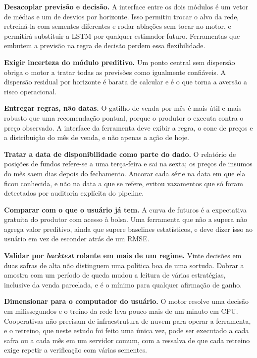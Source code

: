 \begin{alineas}
	\item \textbf{Desacoplar previsão e decisão.} A interface entre os dois módulos é um vetor de médias e um de desvios por horizonte. Isso permitiu trocar o alvo da rede, retreiná-la com sementes diferentes e rodar ablações sem tocar no motor, e permitirá substituir a LSTM por qualquer estimador futuro. Ferramentas que embutem a previsão na regra de decisão perdem essa flexibilidade.
	\item \textbf{Exigir incerteza do módulo preditivo.} Um ponto central sem dispersão obriga o motor a tratar todas as previsões como igualmente confiáveis. A dispersão residual por horizonte é barata de calcular e é o que torna a aversão a risco operacional.
	\item \textbf{Entregar regras, não datas.} O gatilho de venda por mês é mais útil e mais robusto que uma recomendação pontual, porque o produtor o executa contra o preço observado. A interface da ferramenta deve exibir a regra, o cone de preços e a distribuição do mês de venda, e não apenas a ação de hoje.
	\item \textbf{Tratar a data de disponibilidade como parte do dado.} O relatório de posições de fundos refere-se a uma terça-feira e sai na sexta; os preços de insumos do mês saem dias depois do fechamento. Ancorar cada série na data em que ela ficou conhecida, e não na data a que se refere, evitou vazamentos que só foram detectados por auditoria explícita do pipeline.
	\item \textbf{Comparar com o que o usuário já tem.} A curva de futuros é a expectativa gratuita do produtor com acesso à bolsa. Uma ferramenta que não a supera não agrega valor preditivo, ainda que supere baselines estatísticos, e deve dizer isso ao usuário em vez de esconder atrás de um RMSE.
	\item \textbf{Validar por \textit{backtest} rolante em mais de um regime.} Vinte decisões em duas safras de alta não distinguem uma política boa de uma sortuda. Dobrar a amostra com um período de queda mudou a leitura de várias estratégias, inclusive da venda parcelada, e é o mínimo para qualquer afirmação de ganho.
	\item \textbf{Dimensionar para o computador do usuário.} O motor resolve uma decisão em milissegundos e o treino da rede leva pouco mais de um minuto em CPU. Cooperativas não precisam de infraestrutura de nuvem para operar a ferramenta, e o retreino, que neste estudo foi feito uma única vez, pode ser executado a cada safra ou a cada mês em um servidor comum, com a ressalva de que cada retreino exige repetir a verificação com várias sementes.

\end{alineas}
